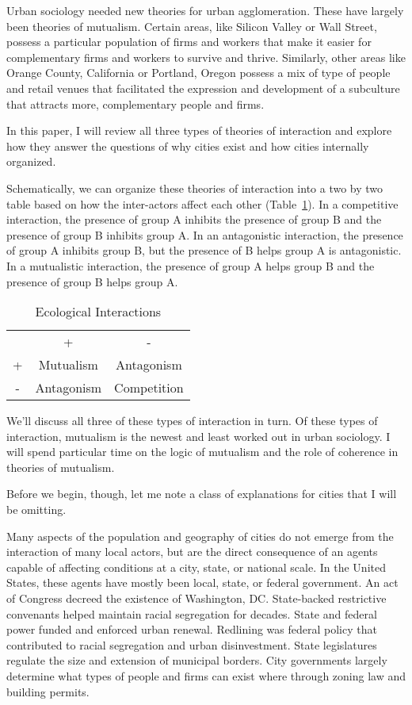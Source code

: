 Urban sociology needed new theories for urban agglomeration. These
have largely been theories of mutualism. Certain areas, like Silicon
Valley or Wall Street, possess a particular population of firms and
workers that make it easier for complementary firms and workers to
survive and thrive. Similarly, other areas like Orange County,
California or Portland, Oregon possess a mix of type of people and
retail venues that facilitated the expression and development of a
subculture that attracts more, complementary people and firms.

In this paper, I will review all three types of theories of
interaction and explore how they answer the questions of why cities
exist and how cities internally organized. 

Schematically, we can organize these theories of interaction into a
two by two table based on how the inter-actors affect each other
(Table~\ref{tab:ecological}). In a competitive interaction, the
presence of group A inhibits the presence of group B and the presence
of group B inhibits group A. In an antagonistic interaction, the
presence of group A inhibits group B, but the presence of B helps
group A is antagonistic. In a mutualistic interaction, the presence of
group A helps group B and the presence of group B helps group A.

\begin{table}[h]
\centering
\begin{tabular}{ccc}
  & +          & -           &  \\
+ & Mutualism  & Antagonism  &  \\
- & Antagonism & Competition & 
\end{tabular}
\caption{Ecological Interactions}
\label{tab:ecological}
\end{table}

We'll discuss all three of these types of interaction in turn. Of
these types of interaction, mutualism is the newest and least worked
out in urban sociology. I will spend particular time on the logic of
mutualism and the role of coherence in theories of mutualism.

Before we begin, though, let me note a class of explanations for
cities that I will be omitting.

Many aspects of the population and geography of cities do not emerge
from the interaction of many local actors, but are the direct
consequence of an agents capable of affecting conditions at a city,
state, or national scale. In the United States, these agents have
mostly been local, state, or federal government. An act of Congress
decreed the existence of Washington, DC. State-backed restrictive
convenants helped maintain racial segregation for decades. State and
federal power funded and enforced urban renewal. Redlining was federal
policy that contributed to racial segregation and urban
disinvestment. State legislatures regulate the size and extension of
municipal borders. City governments largely determine what types of
people and firms can exist where through zoning law and building
permits.

